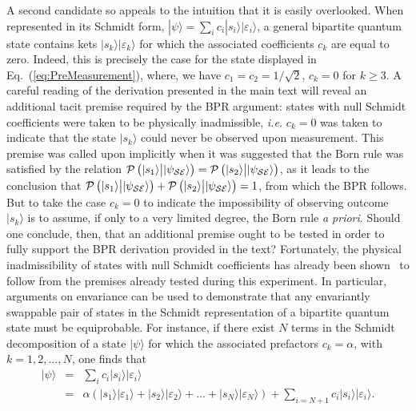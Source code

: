 \documentclass[12pt]{iopart}
\begin{document}
 A second candidate  so appeals to the intuition that it is easily overlooked. When represented in its Schmidt form, $|\psi\rangle = \sum_i c_i |s_i\rangle|\varepsilon_i\rangle$, a general bipartite quantum state contains kets $|s_k\rangle|\varepsilon_k\rangle$ for which the associated coefficients $c_k$ are equal to zero. Indeed, this is precisely the case for the state displayed in Eq.~(\ref{eq:PreMeasurement}), where, we have $c_1=c_2=1/\sqrt{2}$, $c_k=0$ for $k\geq3$. A careful reading of the derivation presented in the main text will reveal an additional tacit premise required by the BPR argument: states with null Schmidt coefficients were taken to be physically inadmissible, \textit{i.e.} $c_k=0$ was taken to indicate that the state $|s_k\rangle$ could never be observed upon measurement. This premise was called upon implicitly when it was suggested that the Born rule was satisfied by the relation ${\cal P}\left(|s_1\rangle {\big |} |\psi_{\cal SE} \rangle \right)={\cal P}\left(|s_2\rangle {\big |} |\psi_{\cal SE} \rangle \right)$, as it leads to the conclusion that ${\cal P}\left(|s_1\rangle {\big |} |\psi_{\cal SE} \rangle \right)+{\cal P}\left(|s_2\rangle {\big |} |\psi_{\cal SE} \rangle \right)=1$, from which the BPR follows. But to take the case $c_k=0$ to indicate the impossibility of observing outcome $|s_k\rangle$ is to assume, if only to a very limited degree, the Born rule \textit{a priori}. Should one conclude, then, that an additional premise ought to be tested in order to fully support the BPR derivation provided in the text?
%
\sloppy
Fortunately, the physical inadmissibility of states with null Schmidt coefficients has already been shown~\cite{zurek:08} to follow from the premises already tested during this experiment. In particular, arguments on envariance can be used to demonstrate that any envariantly swappable pair of states in the Schmidt representation of a bipartite quantum state must be equiprobable. For instance, if there exist $N$ terms in the Schmidt decomposition of a state $|\psi\rangle$ for which the associated prefactors $c_k=\alpha$, with $k=1,2,...,N$, one finds that
%
\begin{eqnarray}\label{eq:nullschmidt1}
	|\psi\rangle&=& \sum_i c_i |s_i\rangle|\varepsilon_i\rangle\\\nonumber 
	&=& \alpha\left(|s_1\rangle|\varepsilon_1\rangle + |s_2\rangle|\varepsilon_2\rangle + ... + |s_N\rangle|\varepsilon_N\rangle \right)+ \sum_{i=N+1}c_i |s_i\rangle|\varepsilon_i\rangle.
\end{eqnarray}
%
\end{document}

